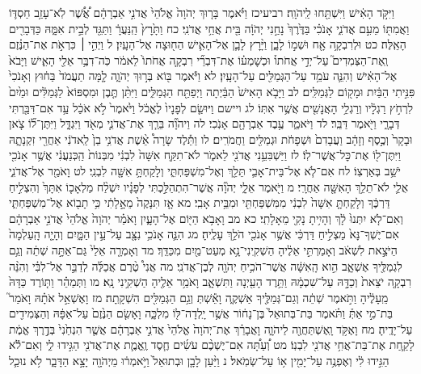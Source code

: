 \documentclass[twoside, openany, parskip=half, 11pt]{book}
\begin{document}
וַיִּקֹּ֣ד הָאִ֔ישׁ וַיִּשְׁתַּ֖חוּ לַֽיהֹוָֽה׃ רביעיכז וַיֹּ֗אמֶר בָּר֤וּךְ יְהֹוָה֙ אֱלֹהֵי֙ אֲדֹנִ֣י אַבְרָהָ֔ם אֲ֠שֶׁ֠ר לֹֽא־עָזַ֥ב חַסְדּ֛וֹ וַאֲמִתּ֖וֹ מֵעִ֣ם אֲדֹנִ֑י אָנֹכִ֗י בַּדֶּ֙רֶךְ֙ נָחַ֣נִי יְהֹוָ֔ה בֵּ֖ית אֲחֵ֥י אֲדֹנִֽי׃ כח וַתָּ֙רׇץ֙ הַֽנַּעֲרָ֔ וַתַּגֵּ֖ד לְבֵ֣ית אִמָּ֑הּ כַּדְּבָרִ֖ים הָאֵֽלֶּה׃ כט וּלְרִבְקָ֥ה אָ֖ח וּשְׁמ֣וֹ לָבָ֑ן וַיָּ֨רׇץ לָבָ֧ן אֶל־הָאִ֛ישׁ הַח֖וּצָה אֶל־הָעָֽיִן׃ ל וַיְהִ֣י ׀ כִּרְאֹ֣ת אֶת־הַנֶּ֗זֶם וְֽאֶת־הַצְּמִדִים֮ עַל־יְדֵ֣י אֲחֹתוֹ֒ וּכְשׇׁמְע֗וֹ אֶת־דִּבְרֵ֞י רִבְקָ֤ה אֲחֹתוֹ֙ לֵאמֹ֔ר כֹּֽה־דִבֶּ֥ר אֵלַ֖י הָאִ֑ישׁ וַיָּבֹא֙ אֶל־הָאִ֔ישׁ וְהִנֵּ֛ה עֹמֵ֥ד עַל־הַגְּמַלִּ֖ים עַל־הָעָֽיִן׃ לא וַיֹּ֕אמֶר בּ֖וֹא בְּר֣וּךְ יְהֹוָ֑ה לָ֤מָּה תַעֲמֹד֙ בַּח֔וּץ וְאָנֹכִי֙ פִּנִּ֣יתִי הַבַּ֔יִת וּמָק֖וֹם לַגְּמַלִּֽים׃ לב וַיָּבֹ֤א הָאִישׁ֙ הַבַּ֔יְתָה וַיְפַתַּ֖ח הַגְּמַלִּ֑ים וַיִּתֵּ֨ן תֶּ֤בֶן וּמִסְפּוֹא֙ לַגְּמַלִּ֔ים וּמַ֙יִם֙ לִרְחֹ֣ץ רַגְלָ֔יו וְרַגְלֵ֥י הָאֲנָשִׁ֖ים אֲשֶׁ֥ר אִתּֽוֹ׃ לג ויישם וַיּוּשַׂ֤ם לְפָנָיו֙ לֶאֱכֹ֔ל וַיֹּ֙אמֶר֙ לֹ֣א אֹכַ֔ל עַ֥ד אִם־דִּבַּ֖רְתִּי דְּבָרָ֑י וַיֹּ֖אמֶר דַּבֵּֽר׃ לד וַיֹּאמַ֑ר עֶ֥בֶד אַבְרָהָ֖ם אָנֹֽכִי׃ לה וַיהֹוָ֞ה בֵּרַ֧ךְ אֶת־אֲדֹנִ֛י מְאֹ֖ד וַיִּגְדָּ֑ל וַיִּתֶּן־ל֞וֹ צֹ֤אן וּבָקָר֙ וְכֶ֣סֶף וְזָהָ֔ב וַעֲבָדִם֙ וּשְׁפָחֹ֔ת וּגְמַלִּ֖ים וַחֲמֹרִֽים׃ לו וַתֵּ֡לֶד שָׂרָה֩ אֵ֨שֶׁת אֲדֹנִ֥י בֵן֙ לַֽאדֹנִ֔י אַחֲרֵ֖י זִקְנָתָ֑הּ וַיִּתֶּן־ל֖וֹ אֶת־כׇּל־אֲשֶׁר־לֽוֹ׃ לז וַיַּשְׁבִּעֵ֥נִי אֲדֹנִ֖י לֵאמֹ֑ר לֹא־תִקַּ֤ח אִשָּׁה֙ לִבְנִ֔י מִבְּנוֹת֙ הַֽכְּנַעֲנִ֔י אֲשֶׁ֥ר אָנֹכִ֖י יֹשֵׁ֥ב בְּאַרְצֽוֹ׃ לח אִם־לֹ֧א אֶל־בֵּית־אָבִ֛י תֵּלֵ֖ךְ וְאֶל־מִשְׁפַּחְתִּ֑י וְלָקַחְתָּ֥ אִשָּׁ֖ה לִבְנִֽי׃ לט וָאֹמַ֖ר אֶל־אֲדֹנִ֑י אֻלַ֛י לֹא־תֵלֵ֥ךְ הָאִשָּׁ֖ה אַחֲרָֽי׃ מ וַיֹּ֖אמֶר אֵלָ֑י יְהֹוָ֞ה אֲשֶׁר־הִתְהַלַּ֣כְתִּי לְפָנָ֗יו יִשְׁלַ֨ח מַלְאָכ֤וֹ אִתָּךְ֙ וְהִצְלִ֣יחַ דַּרְכֶּ֔ךָ וְלָקַחְתָּ֤ אִשָּׁה֙ לִבְנִ֔י מִמִּשְׁפַּחְתִּ֖י וּמִבֵּ֥ית אָבִֽי׃ מא אָ֤ז תִּנָּקֶה֙ מֵאָ֣לָתִ֔י כִּ֥י תָב֖וֹא אֶל־מִשְׁפַּחְתִּ֑י וְאִם־לֹ֤א יִתְּנוּ֙ לָ֔ךְ וְהָיִ֥יתָ נָקִ֖י מֵאָלָתִֽי׃ כא מב וָאָבֹ֥א הַיּ֖וֹם אֶל־הָעָ֑יִן וָאֹמַ֗ר יְהֹוָה֙ אֱלֹהֵי֙ אֲדֹנִ֣י אַבְרָהָ֔ם אִם־יֶשְׁךָ־נָּא֙ מַצְלִ֣יחַ דַּרְכִּ֔י אֲשֶׁ֥ר אָנֹכִ֖י הֹלֵ֥ךְ עָלֶֽיהָ׃ מג הִנֵּ֛ה אָנֹכִ֥י נִצָּ֖ב עַל־עֵ֣ין הַמָּ֑יִם וְהָיָ֤ה הָֽעַלְמָה֙ הַיֹּצֵ֣את לִשְׁאֹ֔ב וְאָמַרְתִּ֣י אֵלֶ֔יהָ הַשְׁקִֽינִי־נָ֥א מְעַט־מַ֖יִם מִכַּדֵּֽךְ׃ מד וְאָמְרָ֤ה אֵלַי֙ גַּם־אַתָּ֣ה שְׁתֵ֔ה וְגַ֥ם לִגְמַלֶּ֖יךָ אֶשְׁאָ֑ב הִ֣וא הָֽאִשָּׁ֔ה אֲשֶׁר־הֹכִ֥יחַ יְהֹוָ֖ה לְבֶן־אֲדֹנִֽי׃ מה אֲנִי֩ טֶ֨רֶם אֲכַלֶּ֜ה לְדַבֵּ֣ר אֶל־לִבִּ֗י וְהִנֵּ֨ה רִבְקָ֤ה יֹצֵאת֙ וְכַדָּ֣הּ עַל־שִׁכְמָ֔הּ וַתֵּ֥רֶד הָעַ֖יְנָה וַתִּשְׁאָ֑ב וָאֹמַ֥ר אֵלֶ֖יהָ הַשְׁקִ֥ינִי נָֽא׃ מו וַתְּמַהֵ֗ר וַתּ֤וֹרֶד כַּדָּהּ֙ מֵֽעָלֶ֔יהָ וַתֹּ֣אמֶר שְׁתֵ֔ה וְגַם־גְּמַלֶּ֖יךָ אַשְׁקֶ֑ה וָאֵ֕שְׁתְּ וְגַ֥ם הַגְּמַלִּ֖ים הִשְׁקָֽתָה׃ מז וָאֶשְׁאַ֣ל אֹתָ֗הּ וָאֹמַר֮ בַּת־מִ֣י אַתְּ֒ וַתֹּ֗אמֶר בַּת־בְּתוּאֵל֙ בֶּן־נָח֔וֹר אֲשֶׁ֥ר יָֽלְדָה־לּ֖וֹ מִלְכָּ֑ה וָאָשִׂ֤ם הַנֶּ֙זֶם֙ עַל־אַפָּ֔הּ וְהַצְּמִידִ֖ים עַל־יָדֶֽיהָ׃ מח וָאֶקֹּ֥ד וָֽאֶשְׁתַּחֲוֶ֖ה לַיהֹוָ֑ה וָאֲבָרֵ֗ךְ אֶת־יְהֹוָה֙ אֱלֹהֵי֙ אֲדֹנִ֣י אַבְרָהָ֔ם אֲשֶׁ֤ר הִנְחַ֙נִי֙ בְּדֶ֣רֶךְ אֱמֶ֔ת לָקַ֛חַת אֶת־בַּת־אֲחִ֥י אֲדֹנִ֖י לִבְנֽוֹ׃ מט וְ֠עַתָּ֠ה אִם־יֶשְׁכֶ֨ם עֹשִׂ֜ים חֶ֧סֶד וֶֽאֱמֶ֛ת אֶת־אֲדֹנִ֖י הַגִּ֣ידוּ לִ֑י וְאִם־לֹ֕א הַגִּ֣ידוּ לִ֔י וְאֶפְנֶ֥ה עַל־יָמִ֖ין א֥וֹ עַל־שְׂמֹֽאל׃ נ וַיַּ֨עַן לָבָ֤ן וּבְתוּאֵל֙ וַיֹּ֣אמְר֔וּ מֵיְהֹוָ֖ה יָצָ֣א הַדָּבָ֑ר לֹ֥א נוּכַ֛ל 
\end{document}
